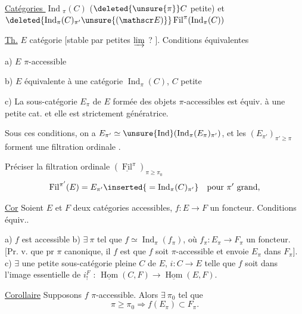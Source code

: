 \uline{Catégories $\operatorname{Ind}$}$_\pi(C)$ ($\deleted{\unsure{\pi}} C$ petite) et $\deleted{\operatorname{Ind}_\pi(C)_{\pi'}\unsure{(\mathscr E)}}\operatorname{Fil}^{\pi}(\operatorname{Ind}_{\pi}(C))$

\uline{Th.} $E$ catégorie [stable par petites $\varinjlim$ ? ]. Conditions équivalentes

a) $E$ $\pi$-accessible

b) $E$ équivalente à une catégorie $\operatorname{Ind}_\pi(C)$, $C$ petite

c) La sous-catégorie $E_\pi$ de $E$ formée des objets $\pi$-accessibles est équiv. à une petite cat. et elle est strictement génératrice.


Sous ces conditions,  on a $E_{\pi'}\simeq\unsure{\operatorname{Ind}}(\operatorname{Ind}_{\pi}(E_\pi)_{\pi'})$, et les $(E_{\pi'})_{\pi'\geq\pi}$ forment une filtration ordinale
.

Préciser la filtration ordinale  $(\underline{\operatorname{Fil}}^{\pi})_{\pi\geq\pi_0}$ \unsure{---}
\[
 \operatorname{Fil}^{\pi'}(E)=E_{\pi'}\inserted{{}=\operatorname{Ind}_{\pi}(C)_{\pi'}}\quad\text{pour $\pi'$ grand,}
\]

\uline{Cor} Soient $E$ et $F$ deux catégories accessibles,   $f:E\to F$ un foncteur.  Conditions équiv..

a) $f$ est \deleted{$\pi$-}accessible  b) $\exists\ \pi$ tel que $f\simeq\operatorname{Ind}_\pi(f_\pi)$, où $f_\pi:E_\pi\to F_\pi$ un foncteur.  [Pr. v. que pr $\pi$ canonique, il $f$ est  que $f$ soit $\pi$-accessible et envoie $E_\pi$ dans $F_\pi$]. c) $\exists$ une petite sous-catégorie pleine $C$ de $E$, $i:C\to E$ telle que $f$ soit dans l'image essentielle de $i_!^F$ :
 $\underline{\operatorname{Hom}}(C,F)\to\underline{\operatorname{Hom}}(E,F)$.

\uline{Corollaire} Supposons $f$ $\pi$-accessible. Alors  $\exists\ \pi_0$ tel que
\[
 \pi\geq\pi_0\Longrightarrow f(E_\pi)\subset F_\pi .
\]

